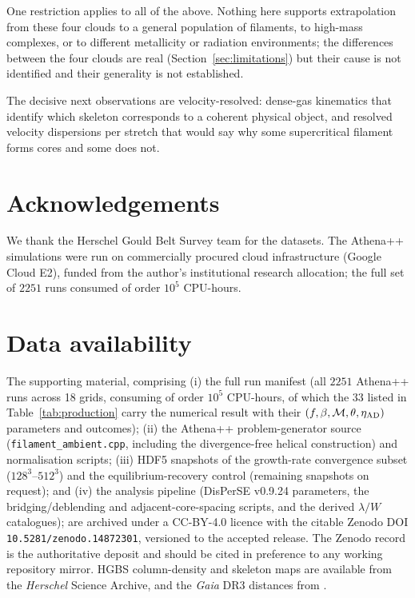 \documentclass[usenatbib,twoside,twocolumn]{mnras}
\begin{document}
One restriction applies to all of the above. Nothing here supports extrapolation from these four clouds to a general population of filaments, to high-mass complexes, or to different metallicity or radiation environments; the differences between the four clouds are real (Section~\ref{sec:limitations}) but their cause is not identified and their generality is not established.

The decisive next observations are velocity-resolved: dense-gas kinematics that identify which skeleton corresponds to a coherent physical object, and resolved velocity dispersions per stretch that would say why some supercritical filament forms cores and some does not.

\section*{Acknowledgements}

We thank the Herschel Gould Belt Survey team for the datasets. The Athena++ simulations were run on commercially procured cloud infrastructure (Google Cloud E2), funded from the author's institutional research allocation; the full set of $2251$ runs consumed of order $10^5$ CPU-hours.

\section*{Data availability}

The supporting material, comprising (i) the full run manifest (all $2251$ Athena++ runs across 18 grids, consuming of order $10^5$ CPU-hours, of which the $33$ listed in Table~\ref{tab:production} carry the numerical result with their $(f,\beta,\mathcal{M},\theta,\eta_{\rm AD})$ parameters and outcomes); (ii) the Athena++ problem-generator source (\texttt{filament\_ambient.cpp}, including the divergence-free helical construction) and normalisation scripts; (iii) HDF5 snapshots of the growth-rate convergence subset ($128^3$--$512^3$) and the equilibrium-recovery control (remaining snapshots on request); and (iv) the analysis pipeline (DisPerSE v0.9.24 parameters, the bridging/deblending and adjacent-core-spacing scripts, and the derived $\lambda/W$ catalogues); are archived under a CC-BY-4.0 licence with the citable Zenodo DOI \texttt{10.5281/zenodo.14872301}, versioned to the accepted release. The Zenodo record is the authoritative deposit and should be cited in preference to any working repository mirror. HGBS column-density and skeleton maps are available from the \textit{Herschel} Science Archive, and the \textit{Gaia} DR3 distances from \citet{Zhang2023}.
\end{document}
